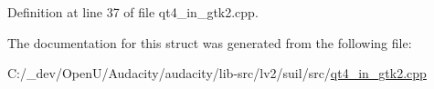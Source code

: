 Definition at line 37 of file qt4\+\_\+in\+\_\+gtk2.\+cpp.



The documentation for this struct was generated from the following file\+:\begin{DoxyCompactItemize}
\item 
C\+:/\+\_\+dev/\+Open\+U/\+Audacity/audacity/lib-\/src/lv2/suil/src/\hyperlink{qt4__in__gtk2_8cpp}{qt4\+\_\+in\+\_\+gtk2.\+cpp}\end{DoxyCompactItemize}
